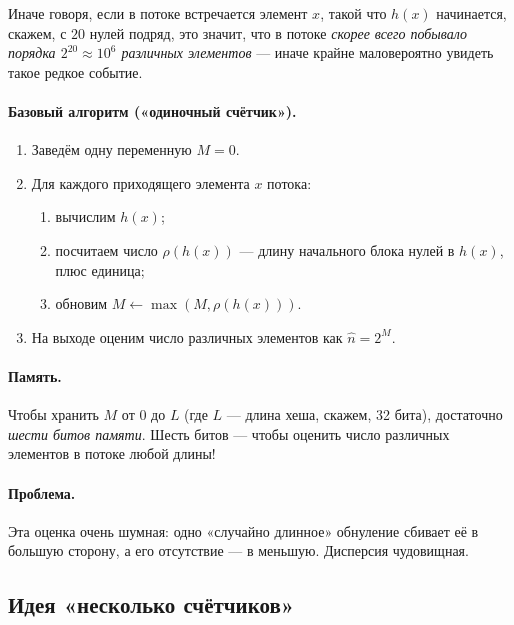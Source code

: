 Иначе говоря, если в потоке встречается элемент $x$, такой что $h(x)$ начинается, скажем, с $20$ нулей подряд, это значит, что в потоке \emph{скорее всего побывало порядка $2^{20} \approx 10^6$ различных элементов} --- иначе крайне маловероятно увидеть такое редкое событие.

\paragraph*{Базовый алгоритм («одиночный счётчик»).}

\begin{algorithmbox}[title={Алгоритм: наивный счётчик различных элементов}]
\begin{enumerate}
  \item Заведём одну переменную $M = 0$.
  \item Для каждого приходящего элемента $x$ потока:
  \begin{enumerate}
    \item вычислим $h(x)$;
    \item посчитаем число $\rho(h(x))$ --- длину начального блока нулей в $h(x)$, плюс единица;
    \item обновим $M \leftarrow \max(M, \rho(h(x)))$.
  \end{enumerate}
  \item На выходе оценим число различных элементов как $\widehat{n} = 2^M$.
\end{enumerate}
\end{algorithmbox}

\paragraph*{Память.} Чтобы хранить $M$ от $0$ до $L$ (где $L$ --- длина хеша, скажем, 32 бита), достаточно \emph{шести битов памяти}. Шесть битов --- чтобы оценить число различных элементов в потоке любой длины!

\paragraph*{Проблема.} Эта оценка очень шумная: одно «случайно длинное» обнуление сбивает её в большую сторону, а его отсутствие --- в меньшую. Дисперсия чудовищная.

\subsection{Идея «несколько счётчиков»}

